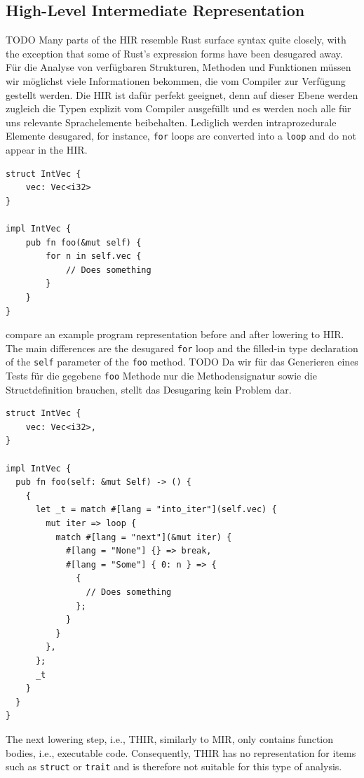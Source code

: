 \documentclass[paper=a4,%
  twoside,%
  BCOR4mm,%
  abstract=true,%
  toc=bibliography,%
  chapterprefix=true,%
  toc=bibliographynumbered,%
  open=right,%
  english,%
  pagesize=pdftex]{scrreprt}
\newcommand{\hir}{\ac{HIR}\xspace}
\newcommand{\mir}{\ac{MIR}\xspace}
\begin{document}
\subsection{High-Level Intermediate Representation}
TODO Many parts of the \hir resemble Rust surface syntax quite closely, with the exception that some of Rust's expression forms have been desugared away. Für die Analyse von verfügbaren Strukturen, Methoden und Funktionen müssen wir möglichst viele Informationen bekommen, die vom Compiler zur Verfügung gestellt werden. Die \hir ist dafür perfekt geeignet, denn auf dieser Ebene werden zugleich die Typen explizit vom Compiler ausgefüllt und es werden noch alle für uns relevante Sprachelemente beibehalten. Lediglich werden intraprozedurale Elemente desugared, for instance, \texttt{for} loops are converted into a \texttt{loop} and do not appear in the \hir.
\begin{lstlisting}[style=boxed, caption={An example Rust program that we convert to HIR}, label=lst:hir-lowering]
struct IntVec {
    vec: Vec<i32>
}

impl IntVec {
    pub fn foo(&mut self) {
        for n in self.vec {
            // Does something
        }
    }
}
\end{lstlisting}

 compare an example program representation before and after lowering to \hir. The main differences are the desugared \texttt{for} loop and the filled-in type declaration of the \texttt{self} parameter of the \texttt{foo} method. TODO Da wir für das Generieren eines Tests für die gegebene \texttt{foo} Methode nur die Methodensignatur sowie die Structdefinition brauchen, stellt das Desugaring kein Problem dar.

\begin{lstlisting}[style=boxed, caption={HIR of the code in \Cref{lst:hir-lowering}}, label=lst:hir-lowered]
struct IntVec {
    vec: Vec<i32>,
}

impl IntVec {
  pub fn foo(self: &mut Self) -> () {
    {
      let _t = match #[lang = "into_iter"](self.vec) {
        mut iter => loop {
          match #[lang = "next"](&mut iter) {
            #[lang = "None"] {} => break,
            #[lang = "Some"] { 0: n } => {
              {
                // Does something
              };
            }
          }
        },
      };
      _t
    }
  }
}
\end{lstlisting}

The next lowering step, i.e., \ac{THIR}, similarly to \mir, only contains function bodies, i.e., executable code. Consequently, \ac{THIR} has no representation for items such as \texttt{struct} or \texttt{trait} and is therefore not suitable for this type of analysis.
\end{document}
